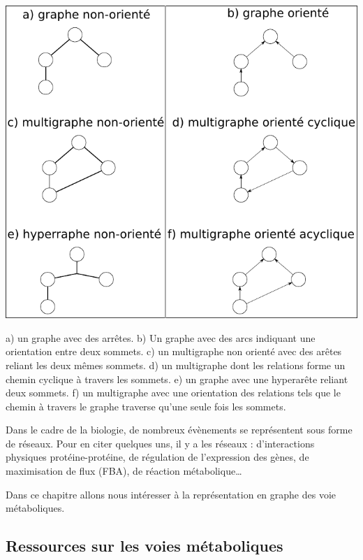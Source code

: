 \begin{refsegment}
    
    \begin{shadedfigure}[H]
    	\centering
    	\includegraphics[width=\textwidth]{img/graph.pdf}
    	\caption{a) un graphe  avec des arrêtes. b) Un graphe avec des arcs indiquant une orientation entre deux sommets. c) un multigraphe non orienté avec des arêtes reliant les deux mêmes sommets. d) un multigraphe dont les relations forme un chemin cyclique à travers les sommets. e) un graphe avec une hyperarête reliant deux sommets. f) un multigraphe avec une orientation des relations tels que le chemin à travers le graphe traverse qu'une seule fois les sommets. }
    	\label{fig:graphe}
    \end{shadedfigure}
    
    
    
    Dans le cadre de la biologie, de nombreux évènements se représentent sous forme de réseaux. Pour en citer quelques uns, il y a les réseaux : d'interactions physiques protéine-protéine, de régulation de l'expression des gènes, de maximisation de flux (\acrfull{FBA}), de réaction métabolique… 
    
    Dans ce chapitre allons nous intéresser à la représentation en graphe des voie métaboliques. 
    
    \subsection{Ressources sur les voies métaboliques}
    

\end{refsegment}
